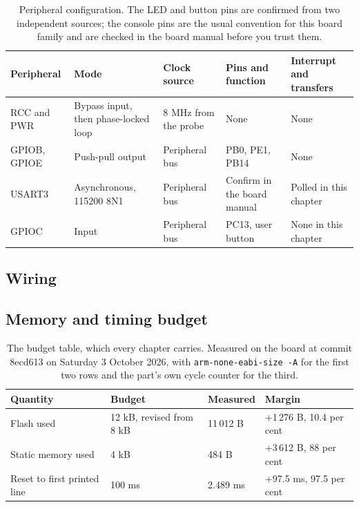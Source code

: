\begin{table}[H]\centering\small
\begin{tabular}{p{22mm}p{26mm}p{24mm}p{30mm}p{30mm}}
\toprule
Peripheral & Mode & Clock source & Pins and function & Interrupt and transfers \\
\midrule
RCC and PWR & Bypass input, then phase-locked loop & 8 MHz from the probe & None & None \\
GPIOB, GPIOE & Push-pull output & Peripheral bus & PB0, PE1, PB14 & None \\
USART3 & Asynchronous, 115200 8N1 & Peripheral bus & Confirm in the board manual & Polled in this chapter \\
GPIOC & Input & Peripheral bus & PC13, user button & None in this chapter \\
\bottomrule
\end{tabular}
\caption{Peripheral configuration. The LED and button pins are confirmed from two independent sources; the console pins are the usual convention for this board family and are checked in the board manual before you trust them.}
\end{table}

\subsection*{Wiring}


\subsection*{Memory and timing budget}


\begin{table}[H]\centering\small
\begin{tabular}{p{44mm}p{28mm}p{28mm}p{30mm}}
\toprule
Quantity & Budget & Measured & Margin \\
\midrule
Flash used & 12 kB, revised from 8 kB & 11\,012 B & +1\,276 B, 10.4 per cent \\
Static memory used & 4 kB & 484 B & +3\,612 B, 88 per cent \\
Reset to first printed line & 100 ms & 2.489 ms & +97.5 ms, 97.5 per cent \\
\bottomrule
\end{tabular}
\caption{The budget table, which every chapter carries. Measured on the board at commit 8ecd613 on Saturday 3 October 2026, with \texttt{arm-none-eabi-size -A} for the first two rows and the part's own cycle counter for the third.}
\end{table}

